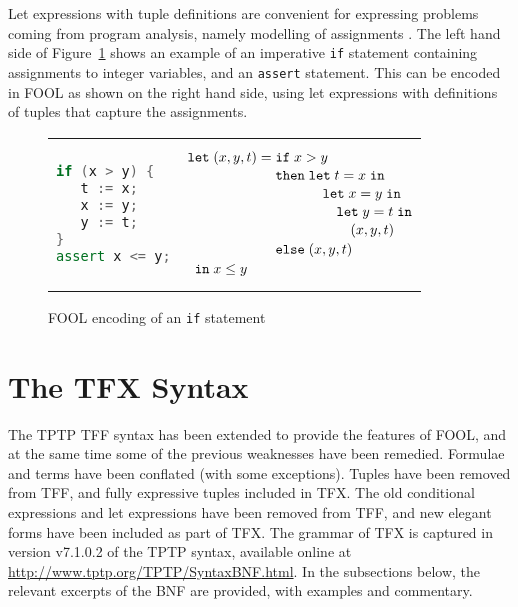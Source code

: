 Let expressions with tuple definitions are convenient for expressing 
problems coming from program analysis, namely modelling of assignments
\cite{KKV18}.
The left hand side of Figure~\ref{fig:tfx/simple-if} shows an example of an 
imperative \texttt{if} statement containing assignments to integer variables, 
and an \texttt{assert} statement. 
This can be encoded in FOOL as shown on the right hand side, using 
let expressions with definitions of tuples that capture the assignments.

\begin{figure}[htbp]
\begin{center}
\begin{tabular}[t]{ll}
\begin{minipage}{0.245\textwidth}
\vspace{0.8cm}
\begin{lstlisting}[language=cpp]
if (x > y) {
   t := x;
   x := y;
   y := t;
}
assert x <= y;
\end{lstlisting}
\end{minipage}
&\hspace{0.4cm}
\begin{minipage}{0.5\textwidth}
\[
  \letnl{(x,y,t)}{\itenll{x > y}
                 {\letinnl{t}{x}
                          {\letinnl{x}{y}
                                   {\letinnl{y}{t}
                                            {(x,y,t)}}}}
                 {(x,y,t)}}
        {x \le y}
\]
\end{minipage}
\\
\end{tabular}
\end{center}
\caption{FOOL encoding of an {\tt if} statement}
\label{fig:tfx/simple-if}
\end{figure}

\section{The TFX Syntax}
\label{sec:tfx/TFX}

The TPTP TFF syntax has been extended to provide the features of FOOL,
and at the same time some of the previous weaknesses have been remedied.
Formulae and terms have been conflated (with some exceptions).
Tuples have been removed from TFF, and fully expressive tuples included in 
TFX. 
The old conditional expressions and let expressions have been removed from 
TFF, and new elegant forms have been included as part of TFX. 
The grammar of TFX is captured in version v7.1.0.2 of the TPTP syntax,
available online at \url{http://www.tptp.org/TPTP/SyntaxBNF.html}.
In the subsections below, the relevant excerpts of the BNF are provided,
with examples and commentary.

